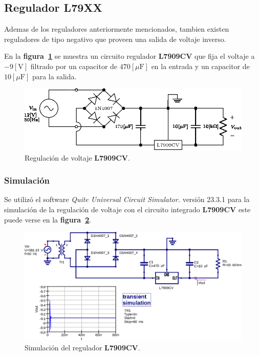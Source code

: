 \subsection{Regulador L79XX}
Ademas de los reguladores anteriormente mencionados, tambien existen reguladores
de tipo negativo que proveen una salida de voltaje inverso.

En la \textbf{figura~\ref{circuito10}} se muestra un circuito regulador
\textbf{L7909CV} que fija el voltaje a $-9[\text{V}]$ filtrado por un capacitor
de $470[\mu\text{F}]$ en la entrada y un capacitor de $10[\mu\text{F}]$ para la
salida.

\begin{figure}[!h]
\centering
\includegraphics[scale=1.20]{diagramas/10.regulador2.eps}
\caption{Regulación de voltaje \textbf{L7909CV}.}
\label{circuito10}
\end{figure}

\subsubsection{Simulación}
Se utilizó el software \emph{Quite Universal Circuit Simulator.} versión 23.3.1
para la simulación de la regulación de voltaje con el circuito integrado
\textbf{L7909CV} este puede verse en la \textbf{figura~\ref{simulacion10}}.

\begin{figure}[!h]
\centering
\includegraphics[scale=0.75]{simulacion/10.regulador2.eps}
\caption{Simulación del regulador \textbf{L7909CV}.}
\label{simulacion10}
\end{figure}

